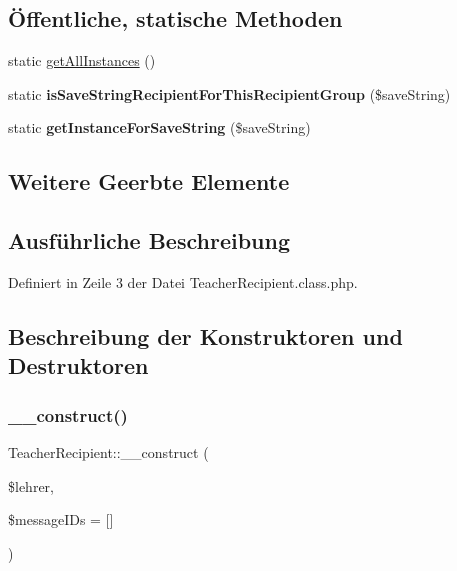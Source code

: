 \subsection*{Öffentliche, statische Methoden}
\begin{DoxyCompactItemize}
\item 
static \mbox{\hyperlink{class_teacher_recipient_a613bc7631745ecb94d30e4b5de44d550}{get\+All\+Instances}} ()
\item 
\mbox{\label{class_teacher_recipient_a8bd4f06bf06da454d43c3fe0c31766f3}} 
static {\bfseries is\+Save\+String\+Recipient\+For\+This\+Recipient\+Group} (\$save\+String)
\item 
\mbox{\label{class_teacher_recipient_ae748fbdf878d96afbc796bc68ddf8d9d}} 
static {\bfseries get\+Instance\+For\+Save\+String} (\$save\+String)
\end{DoxyCompactItemize}
\subsection*{Weitere Geerbte Elemente}


\subsection{Ausführliche Beschreibung}


Definiert in Zeile 3 der Datei Teacher\+Recipient.\+class.\+php.



\subsection{Beschreibung der Konstruktoren und Destruktoren}
\mbox{\label{class_teacher_recipient_af12d98b70897c09951b8dd6f27411abe}} 
\subsubsection{\texorpdfstring{\+\_\+\+\_\+construct()}{\_\_construct()}}
{\footnotesize\ttfamily Teacher\+Recipient\+::\+\_\+\+\_\+construct (\begin{DoxyParamCaption}\item[{}]{\$lehrer,  }\item[{}]{\$message\+I\+Ds = {\ttfamily \mbox{[}\mbox{]}} }\end{DoxyParamCaption})}



